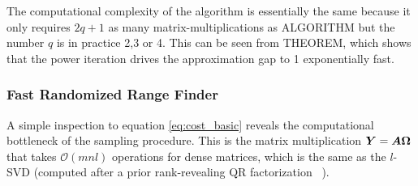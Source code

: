 \begin{figure}[ht]
\begin{center}
\end{center}
\end{figure}

The computational complexity of the algorithm is essentially the same because
it only requires $2q+1$ as many matrix-multiplications as ALGORITHM
but the number $q$ is in practice 2,3 or 4. This can be seen from 
THEOREM, which shows that the power iteration drives the approximation
gap to 1 exponentially fast.



\subsubsection{Fast Randomized Range Finder}

A simple inspection to equation \ref{eq:cost_basic} reveals the computational
bottleneck of the sampling procedure. This is the matrix multiplication
$\bm{Y}=\bm{A}\bm{\Omega}$ that takes $\mathcal{O}(mnl)$ operations
for dense matrices, which is the same as the $l$-SVD (computed
after a prior rank-revealing QR factorization
~\cite{gu1996efficient}).

